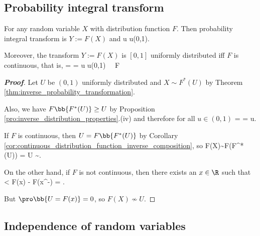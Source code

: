 \subsection{Probability integral transform}

\begin{theorem}\label{thm:probability_integral_transform}
For any random variable $X$ with distribution function $F$. Then probability integral transform is $Y:=F(X)$ and
\be
\pro{} \leq u \quad\forall u\in (0,1).
\ee

Moreover, the transform $Y:=F(X)$ is $[0,1]$ uniformly distributed iff $F$ is continuous, that is,
\be
\pro{} = \pro{} = u \quad\forall u\in (0,1) \ \lra\ F
\ee%
\end{theorem}

\begin{proof}[\bf Proof]
Let $U$ be $(0,1)$ uniformly distributed and $X\sim F^*(U)$ by Theorem \ref{thm:inverse_probability_transformation}.


Also, we have $F\bb{F^*(U)}\geq U$ by Proposition \ref{pro:inverse_distribution_properties}.(iv) and therefore for all $u\in (0,1)$
\be
\pro{} = \pro{} \leq \pro{}  = u.
\ee

If $F$ is continuous, then $U = F\bb{F^*(U)}$ by Corollary \ref{cor:continuous_distribution_function_inverse_composition}, so
\be
F(X)\sim F(F^*(U)) = U \sim {}.
\ee

On the other hand, if $F$ is not continuous, then there exists an $x\in \R$ such that
< F(x) - F(x^-) = \pro{} \leq \pro{}.
\ee

But $\pro\bb{U = F(x)} = 0$, so $F(X) \nsim U$.
\end{proof}

\subsection{Independence of random variables}


